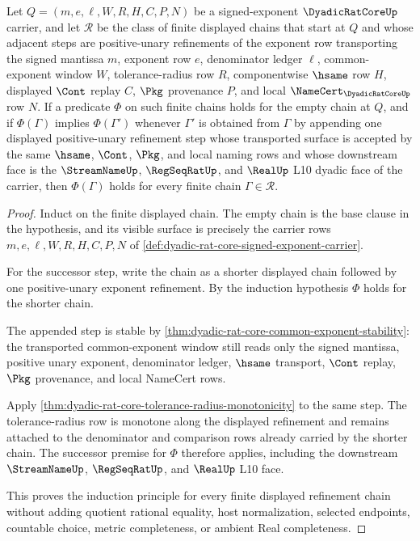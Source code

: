\begin{theorem}\label{thm:dyadic-rat-core-refinement-chain-induction}
Let $Q=(m,e,\ell,W,R,H,C,P,N)$ be a signed-exponent $\DyadicRatCoreUp$ carrier, and let $\mathcal{R}$ be the class of finite displayed chains that start at $Q$ and whose adjacent steps are positive-unary refinements of the exponent row transporting the signed mantissa $m$, exponent row $e$, denominator ledger $\ell$, common-exponent window $W$, tolerance-radius row $R$, componentwise $\hsame$ row $H$, displayed $\Cont$ replay $C$, $\Pkg$ provenance $P$, and local $\NameCert_{\DyadicRatCoreUp}$ row $N$. If a predicate $\Phi$ on such finite chains holds for the empty chain at $Q$, and if $\Phi(\Gamma)$ implies $\Phi(\Gamma')$ whenever $\Gamma'$ is obtained from $\Gamma$ by appending one displayed positive-unary refinement step whose transported surface is accepted by the same $\hsame$, $\Cont$, $\Pkg$, and local naming rows and whose downstream face is the $\StreamNameUp$, $\RegSeqRatUp$, and $\RealUp$ L10 dyadic face of the carrier, then $\Phi(\Gamma)$ holds for every finite chain $\Gamma\in\mathcal{R}$.
\end{theorem}
\begin{proof}
Induct on the finite displayed chain. The empty chain is the base clause in the hypothesis, and its visible surface is precisely the carrier rows $m,e,\ell,W,R,H,C,P,N$ of \autoref{def:dyadic-rat-core-signed-exponent-carrier}.

For the successor step, write the chain as a shorter displayed chain followed by one positive-unary exponent refinement. By the induction hypothesis $\Phi$ holds for the shorter chain.

The appended step is stable by \autoref{thm:dyadic-rat-core-common-exponent-stability}: the transported common-exponent window still reads only the signed mantissa, positive unary exponent, denominator ledger, $\hsame$ transport, $\Cont$ replay, $\Pkg$ provenance, and local NameCert rows.

Apply \autoref{thm:dyadic-rat-core-tolerance-radius-monotonicity} to the same step. The tolerance-radius row is monotone along the displayed refinement and remains attached to the denominator and comparison rows already carried by the shorter chain. The successor premise for $\Phi$ therefore applies, including the downstream $\StreamNameUp$, $\RegSeqRatUp$, and $\RealUp$ L10 face.

This proves the induction principle for every finite displayed refinement chain without adding quotient rational equality, host normalization, selected endpoints, countable choice, metric completeness, or ambient Real completeness.
\end{proof}

